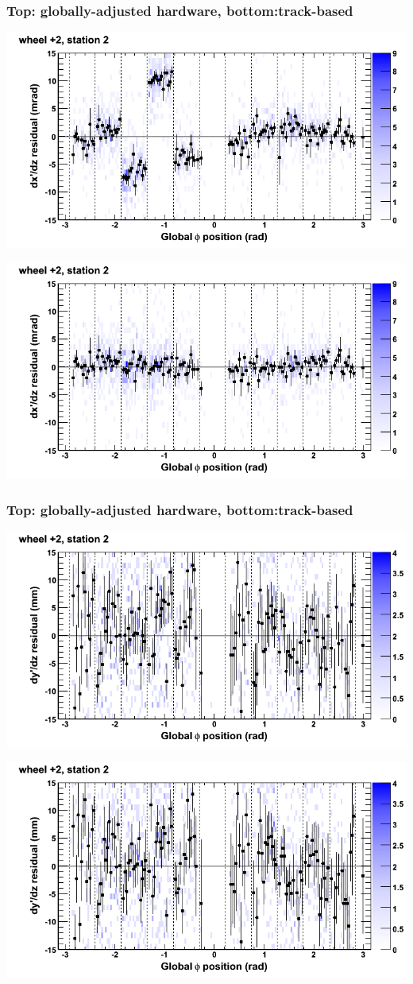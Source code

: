 \documentclass[compress]{beamer}
\begin{document}
\begin{frame}
\frametitle{Top: globally-adjusted hardware, bottom:track-based}
\includegraphics[width=0.7\linewidth]{NOV4_mapplots_HW/DTvsphi_st2whE_dxdz.png}

\includegraphics[width=0.7\linewidth]{NOV4_mapplots/DTvsphi_st2whE_dxdz.png}
\end{frame}

\begin{frame}
\frametitle{Top: globally-adjusted hardware, bottom:track-based}
\includegraphics[width=0.7\linewidth]{NOV4_mapplots_HW/DTvsphi_st2whE_dydz.png}

\includegraphics[width=0.7\linewidth]{NOV4_mapplots/DTvsphi_st2whE_dydz.png}
\end{frame}
\end{document}

